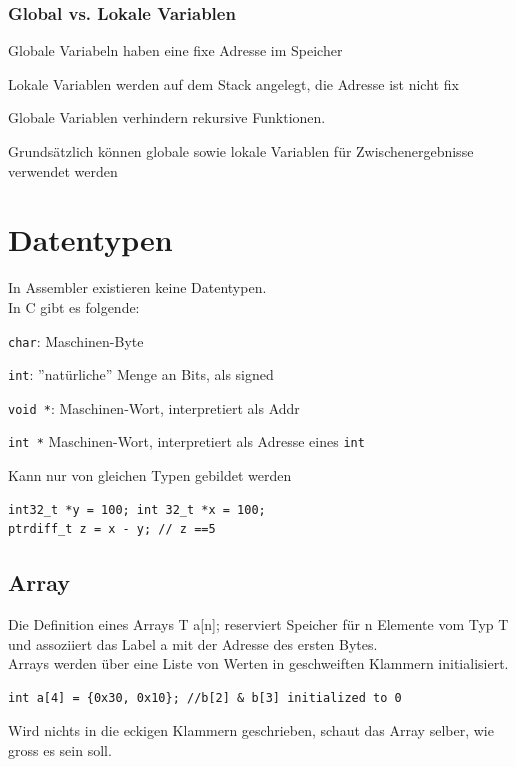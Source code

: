 \documentclass[8pt,landscape,a4paper]{scrartcl}
\begin{document}
\begin{multicols*}{5}
\subsubsection{Global vs. Lokale Variablen}
\begin{compactitem} [$\bullet$]
	\item Globale Variabeln haben eine fixe Adresse im Speicher
	\item Lokale Variablen werden auf dem Stack angelegt, die Adresse ist nicht fix
	\item Globale Variablen verhindern rekursive Funktionen.
	\item Grundsätzlich können globale sowie lokale Variablen für Zwischenergebnisse verwendet werden
\end{compactitem}






\section{Datentypen}
In \textcolor{b}{Assembler} existieren keine Datentypen.\\
In \textcolor{b}{C} gibt es folgende:
\begin{compactitem} [$\bullet$]
	\item \textcolor{b}{\texttt{char}}: Maschinen-Byte
	\item \textcolor{b}{\texttt{int}}: ''natürliche'' Menge an Bits, als signed
	\item \textcolor{b}{\texttt{void *}}: Maschinen-Wort, interpretiert als Addr
	\item \textcolor{b}{\texttt{int *}} Maschinen-Wort, interpretiert als Adresse eines \texttt{int}
\end{compactitem}

Kann nur von gleichen Typen gebildet werden
\begin{lstlisting}
int32_t *y = 100; int 32_t *x = 100;
ptrdiff_t z = x - y; // z ==5
\end{lstlisting}
\subsection{Array}
Die Definition eines Arrays T a[n]; reserviert Speicher für n Elemente vom Typ T und assoziiert das Label a mit der Adresse des ersten Bytes.\\
Arrays werden über eine Liste von Werten in geschweiften Klammern initialisiert.
\begin{lstlisting}
int a[4] = {0x30, 0x10}; //b[2] & b[3] initialized to 0
\end{lstlisting}
Wird nichts in die eckigen Klammern geschrieben, schaut das Array selber, wie gross es sein soll.

\end{multicols*}
\end{document}
